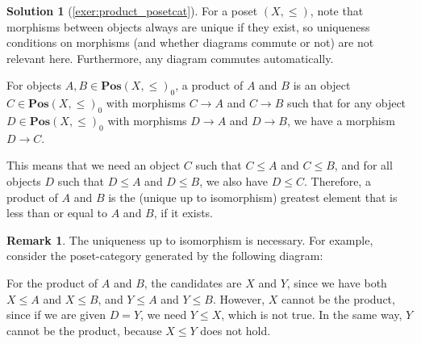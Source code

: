 \documentclass[a4paper,11pt, oneside,titlepage=false]{scrbook}
\theoremstyle{plain}
\theoremstyle{definition}
\newtheorem{rem}[thm]{Remark}
\newtheorem{solution}[thm]{Solution}
\newcommand{\Catb}[1]{\mathbf{#1}}
\newcommand{\POS}{\Catb{Pos}}
\newcommand{\Ob}[1]{{#1}_0}
\begin{document}
\begin{solution}[\cref{exer:product_posetcat}]\label{sol:product_posetcat}
	For a poset $ (X, \leq) $, note that morphisms between objects always are unique if they exist, so uniqueness conditions on morphisms (and whether diagrams commute or not) are not relevant here.
	Furthermore, any diagram commutes automatically.

	For objects $ A, B \in \Ob{\POS(X, \leq)} $, a product of $ A $ and $ B $ is an object $ C \in \Ob{\POS(X, \leq)} $ with morphisms $ C \to A $ and $ C \to B $ such that for any object $ D \in \Ob{\POS(X, \leq)} $ with morphisms $ D \to A $ and $ D \to B $, we have a morphism $ D \to C $.

	This means that we need an object $ C $ such that $ C \leq A $ and $ C \leq B $, and for all objects $ D $ such that $ D \leq A $ and $ D \leq B $, we also have $ D \leq C $. Therefore, a product of $ A $ and $ B $ is the (unique up to isomorphism) greatest element that is less than or equal to $ A $ and $ B $, if it exists.

	\begin{rem}
		The uniqueness up to isomorphism is necessary. For example, consider the poset-category generated by the following diagram:
		\begin{center}
		\end{center}
		For the product of $ A $ and $ B $, the candidates are $ X $ and $ Y $, since we have both $ X \leq A $ and $ X \leq B $, and $ Y \leq A $ and $ Y \leq B $. However, $ X $ cannot be the product, since if we are given $ D = Y $, we need $ Y \leq X $, which is not true. In the same way, $ Y $ cannot be the product, because $ X \leq Y $ does not hold.
	\end{rem}
\end{solution}
\end{document}
